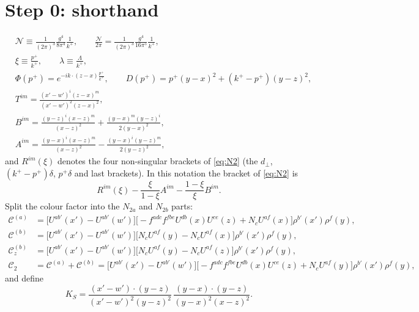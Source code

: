 \documentclass[10pt]{article}
\numberwithin{equation}{section}
\newcommand{\Cz}{\mathcal{C}^{(b)}_{z}}
\newcommand{\Wl}{\Big[U^{ab'}(x')-U^{ab'}(w')\Big]}
\begin{document}
\section{Step 0: shorthand}
\begin{align}
&\mathcal{N}\equiv\frac{1}{(2\pi)^{3}}\frac{g^{4}}{8\pi^{4}}\frac{1}{k^{+}},\qquad \frac{\mathcal{N}}{2\pi}=\frac{1}{(2\pi)^{3}}\frac{g^{4}}{16\pi^{5}}\frac{1}{k^{+}},\\ &\xi\equiv\frac{p^{+}}{k^{+}},\qquad \lambda\equiv\frac{\Lambda}{k^{+}},\\
&\Phi(p^{+})=e^{-ik\cdot(z-x)\frac{p^{+}}{k^{+}}},\qquad D(p^{+})=p^{+}(y-x)^{2}+(k^{+}-p^{+})(y-z)^{2},\\ &T^{im}=\frac{(x'-w')^{i}(z-x)^{m}}{(x'-w')^{2}(z-x)^{2}},\\
&B^{im}=\frac{(y-z)^{i}(x-z)^{m}}{(x-z)^{2}}+\frac{(y-x)^{m}(y-z)^{i}}{2(y-x)^{2}},\\
&A^{im}=\frac{(y-x)^{i}(x-z)^{m}}{(x-z)^{2}}-\frac{(y-x)^{i}(y-z)^{m}}{2(y-z)^{2}},
\end{align}
and $R^{im}(\xi)$ denotes the four non-singular brackets of \eqref{eq:N2} (the $d_{\perp}$, $(k^{+}-p^{+})\delta$, $p^{+}\delta$ and last brackets). In this notation the bracket of \eqref{eq:N2} is
\begin{equation}
R^{im}(\xi)-\frac{\xi}{1-\xi}A^{im}-\frac{1-\xi}{\xi}B^{im}.
\end{equation}
Split the colour factor into the $N_{2a}$ and $N_{2b}$ parts:
\begin{align}
\mathcal{C}^{(a)}&=\Wl\Big[-f^{adc}f^{fbe}U^{db}(x)U^{ce}(z)+N_{c}U^{af}(x)\Big]\rho^{b'}(x')\rho^{f}(y),\\
\mathcal{C}^{(b)}&=\Wl\Big[N_{c}U^{af}(y)-N_{c}U^{af}(x)\Big]\rho^{b'}(x')\rho^{f}(y),\\
\Cz&=\Wl\Big[N_{c}U^{af}(y)-N_{c}U^{af}(z)\Big]\rho^{b'}(x')\rho^{f}(y),\\
\mathcal{C}_{2}&=\mathcal{C}^{(a)}+\mathcal{C}^{(b)}=\Wl\Big[-f^{adc}f^{fbe}U^{db}(x)U^{ce}(z)+N_{c}U^{af}(y)\Big]\rho^{b'}(x')\rho^{f}(y),
\end{align}
and define
\begin{equation}
K_{S}=\frac{(x'-w')\cdot(y-z)}{(x'-w')^{2}(y-z)^{2}}\,\frac{(y-x)\cdot(y-z)}{(y-x)^{2}(x-z)^{2}}.
\end{equation}
\end{document}
